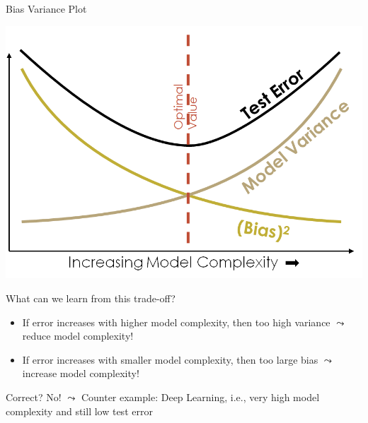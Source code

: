 \documentclass[aspectratio=169]{../latex_main/tntbeamer}  %
\begin{document}
	\begin{frame}{Bias Variance Plot}
	\vspace{-2em}
	   \begin{center}
	        \includegraphics[scale=.2]{Bild14}   
	   \end{center}
	    
	 What can we learn from this trade-off?
	 
	 \begin{itemize}
	     \item If error increases with higher model complexity, then too high variance $\leadsto$ reduce model complexity!
	     \item If error increases with smaller model complexity, then too large bias $\leadsto$ increase model complexity!
	 \end{itemize}
	 
	 Correct? No!
	 $\leadsto$ Counter example: Deep Learning, i.e., very high model complexity and still low test error
	    
	\end{frame}
	
\end{document}
